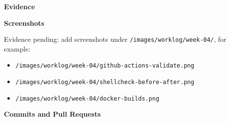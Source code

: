 \vspace{0.5em}\noindent\textbf{Evidence}\par

\vspace{0.5em}\noindent\textbf{Screenshots}\par

Evidence pending: add screenshots under
\texttt{/\allowbreak{}images/\allowbreak{}worklog/\allowbreak{}week-\allowbreak{}04/\allowbreak{}}, for example:

\begin{itemize}
\tightlist
\item
  \texttt{/\allowbreak{}images/\allowbreak{}worklog/\allowbreak{}week-\allowbreak{}04/\allowbreak{}github-\allowbreak{}actions-\allowbreak{}validate.\allowbreak{}png}
\item
  \texttt{/\allowbreak{}images/\allowbreak{}worklog/\allowbreak{}week-\allowbreak{}04/\allowbreak{}shellcheck-\allowbreak{}before-\allowbreak{}after.\allowbreak{}png}
\item
  \texttt{/\allowbreak{}images/\allowbreak{}worklog/\allowbreak{}week-\allowbreak{}04/\allowbreak{}docker-\allowbreak{}builds.\allowbreak{}png}
\end{itemize}

\vspace{0.5em}\noindent\textbf{Commits and Pull
Requests}\par


